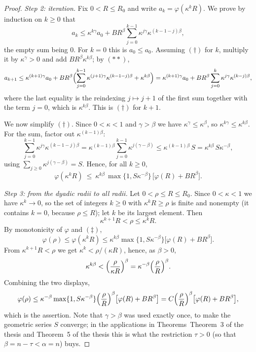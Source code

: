 \begin{proof}
\emph{Step 2: iteration.}  Fix $0<R\le R_0$ and write $a_k=\varphi(\kappa^kR)$.
We prove by induction on $k\ge0$ that
\begin{equation}
a_k\le\kappa^{k\gamma}a_0+BR^{\beta}\sum_{j=0}^{k-1}\kappa^{j\gamma}\kappa^{(k-1-j)\beta}, \tag{$\dagger$}
\end{equation}
the empty sum being $0$.  For $k=0$ this is $a_0\le a_0$.  Assuming $(\dagger)$
for $k$, multiply it by $\kappa^{\gamma}>0$ and add $BR^{\beta}\kappa^{k\beta}$;
by $(**)$,
\[
a_{k+1}\le\kappa^{(k+1)\gamma}a_0
+BR^{\beta}\Bigl(\sum_{j=0}^{k-1}\kappa^{(j+1)\gamma}\kappa^{(k-1-j)\beta}+\kappa^{k\beta}\Bigr)
=\kappa^{(k+1)\gamma}a_0+BR^{\beta}\sum_{j=0}^{k}\kappa^{j\gamma}\kappa^{(k-j)\beta},
\]
where the last equality is the reindexing $j\mapsto j+1$ of the first sum
together with the term $j=0$, which is $\kappa^{k\beta}$.  This is $(\dagger)$
for $k+1$.

We now simplify $(\dagger)$.  Since $0<\kappa<1$ and $\gamma>\beta$ we have
$\kappa^{\gamma}\le\kappa^{\beta}$, so $\kappa^{k\gamma}\le\kappa^{k\beta}$.
For the sum, factor out $\kappa^{(k-1)\beta}$:
\[
\sum_{j=0}^{k-1}\kappa^{j\gamma}\kappa^{(k-1-j)\beta}
=\kappa^{(k-1)\beta}\sum_{j=0}^{k-1}\kappa^{j(\gamma-\beta)}
\le\kappa^{(k-1)\beta}\,S=\kappa^{k\beta}\,S\kappa^{-\beta},
\]
using $\sum_{j\ge0}\kappa^{j(\gamma-\beta)}=S$.  Hence, for all $k\ge0$,
\begin{equation}
\varphi(\kappa^{k}R)\ \le\ \kappa^{k\beta}\,\max\{1,S\kappa^{-\beta}\}\,
\bigl[\varphi(R)+BR^{\beta}\bigr]. \tag{$\ddagger$}
\end{equation}

\emph{Step 3: from the dyadic radii to all radii.}  Let $0<\rho\le R\le R_0$.
Since $0<\kappa<1$ we have $\kappa^{k}\to0$, so the set of integers $k\ge0$ with
$\kappa^{k}R\ge\rho$ is finite and nonempty (it contains $k=0$, because
$\rho\le R$); let $k$ be its largest element.  Then
\[
\kappa^{k+1}R<\rho\le\kappa^{k}R .
\]
By monotonicity of $\varphi$ and $(\ddagger)$,
\[
\varphi(\rho)\le\varphi(\kappa^{k}R)\le\kappa^{k\beta}\max\{1,S\kappa^{-\beta}\}
\bigl[\varphi(R)+BR^{\beta}\bigr].
\]
From $\kappa^{k+1}R<\rho$ we get $\kappa^{k}<\rho/(\kappa R)$, hence, as
$\beta>0$,
\[
\kappa^{k\beta}<\Bigl(\frac{\rho}{\kappa R}\Bigr)^{\beta}
=\kappa^{-\beta}\Bigl(\frac\rho R\Bigr)^{\beta}.
\]
Combining the two displays,
\[
\varphi(\rho)\le\kappa^{-\beta}\max\{1,S\kappa^{-\beta}\}
\Bigl(\frac\rho R\Bigr)^{\beta}\bigl[\varphi(R)+BR^{\beta}\bigr]
=C\Bigl(\frac\rho R\Bigr)^{\beta}\bigl[\varphi(R)+BR^{\beta}\bigr],
\]
which is the assertion.  Note that $\gamma>\beta$ was used exactly once, to make
the geometric series $S$ converge; in the applications in
Theorems~Theorem~3 of the thesis and Theorem~5 of the thesis this is what the restriction $\tau>0$
(so that $\beta=n-\tau<\alpha=n$) buys.
\end{proof}
